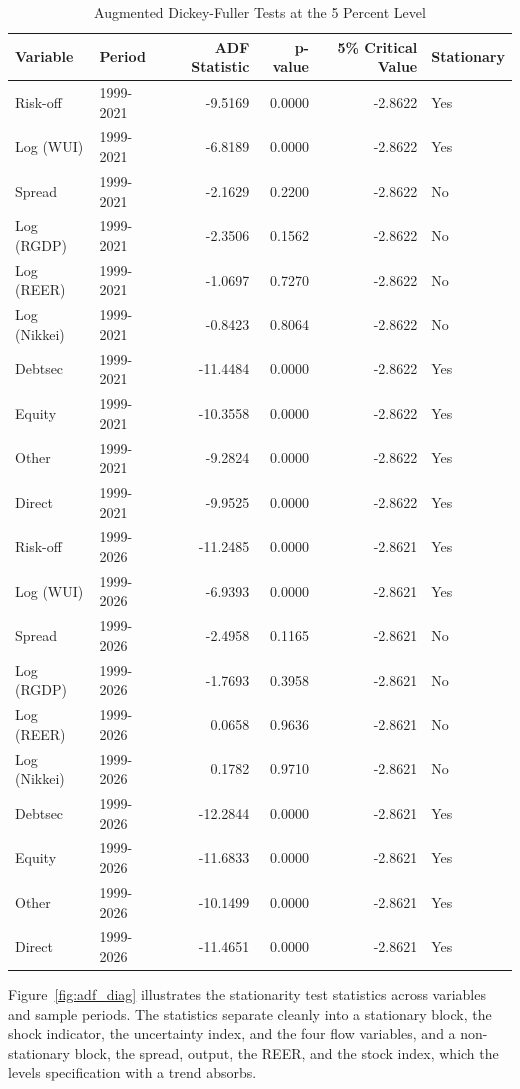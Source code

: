 \FloatBarrier
\begin{table}[H]
  \centering
  \caption{Augmented Dickey-Fuller Tests at the 5 Percent Level}
  \label{tab:adf}
  \small
  \begin{tabular}{l l r r r l}
    \toprule
    Variable & Period & ADF Statistic & p-value & 5\% Critical Value & Stationary \\
    \midrule
Risk-off & 1999-2021 & -9.5169 & 0.0000 & -2.8622 & Yes \\
Log (WUI) & 1999-2021 & -6.8189 & 0.0000 & -2.8622 & Yes \\
Spread & 1999-2021 & -2.1629 & 0.2200 & -2.8622 & No \\
Log (RGDP) & 1999-2021 & -2.3506 & 0.1562 & -2.8622 & No \\
Log (REER) & 1999-2021 & -1.0697 & 0.7270 & -2.8622 & No \\
Log (Nikkei) & 1999-2021 & -0.8423 & 0.8064 & -2.8622 & No \\
Debtsec & 1999-2021 & -11.4484 & 0.0000 & -2.8622 & Yes \\
Equity & 1999-2021 & -10.3558 & 0.0000 & -2.8622 & Yes \\
Other & 1999-2021 & -9.2824 & 0.0000 & -2.8622 & Yes \\
Direct & 1999-2021 & -9.9525 & 0.0000 & -2.8622 & Yes \\
Risk-off & 1999-2026 & -11.2485 & 0.0000 & -2.8621 & Yes \\
Log (WUI) & 1999-2026 & -6.9393 & 0.0000 & -2.8621 & Yes \\
Spread & 1999-2026 & -2.4958 & 0.1165 & -2.8621 & No \\
Log (RGDP) & 1999-2026 & -1.7693 & 0.3958 & -2.8621 & No \\
Log (REER) & 1999-2026 & 0.0658 & 0.9636 & -2.8621 & No \\
Log (Nikkei) & 1999-2026 & 0.1782 & 0.9710 & -2.8621 & No \\
Debtsec & 1999-2026 & -12.2844 & 0.0000 & -2.8621 & Yes \\
Equity & 1999-2026 & -11.6833 & 0.0000 & -2.8621 & Yes \\
Other & 1999-2026 & -10.1499 & 0.0000 & -2.8621 & Yes \\
Direct & 1999-2026 & -11.4651 & 0.0000 & -2.8621 & Yes \\
    \bottomrule
  \end{tabular}
\end{table}
\FloatBarrier

Figure~\ref{fig:adf_diag} illustrates the stationarity test statistics across variables and sample periods. The statistics separate cleanly into a stationary block, the shock indicator, the uncertainty index, and the four flow variables, and a non-stationary block, the spread, output, the REER, and the stock index, which the levels specification with a trend absorbs.

